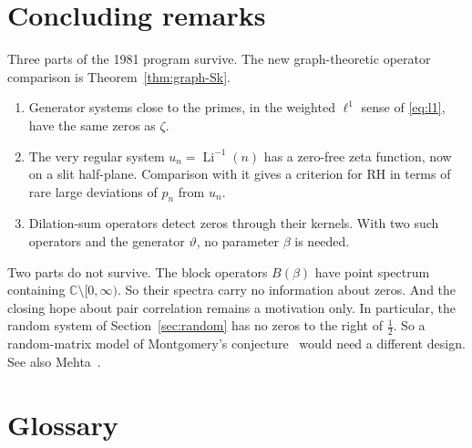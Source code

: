 \documentclass[12pt,letterpaper]{article}
\theoremstyle{definition}
\theoremstyle{remark}
\newcommand{\Li}{\operatorname{Li}}
\newcommand{\CC}{\mathbb{C}}
\newcommand{\yD}{\vartheta}
\begin{document}
\section{Concluding remarks}\label{sec:conclusion}

Three parts of the 1981 program survive. The new graph-theoretic
operator comparison is Theorem~\ref{thm:graph-Sk}.
\begin{enumerate}[label=(\arabic*)]
\item Generator systems close to the primes, in the weighted $\ell^1$
  sense of \eqref{eq:l1}, have the same zeros as $\zeta$.
\item The very regular system $u_n=\Li^{-1}(n)$ has a zero-free zeta
  function, now on a slit half-plane. Comparison with it gives a criterion
  for RH in terms of rare large deviations of $p_n$ from $u_n$.
\item Dilation-sum operators detect zeros through their kernels. With two
  such operators and the generator $\yD$, no parameter $\beta$ is needed.
\end{enumerate}

Two parts do not survive. The block operators $B(\beta)$ have point
spectrum containing $\CC\setminus[0,\infty)$. So their spectra carry no
information about zeros. And the closing hope about pair correlation
remains a motivation only. In particular, the random system of
Section~\ref{sec:random} has no zeros to the right of $\frac12$. So a
random-matrix model of Montgomery's conjecture~\cite{Mo73} would
need a different design. See also Mehta~\cite{Me67}.

\appendix
\section{Glossary}\label{app:glossary}
\end{document}

